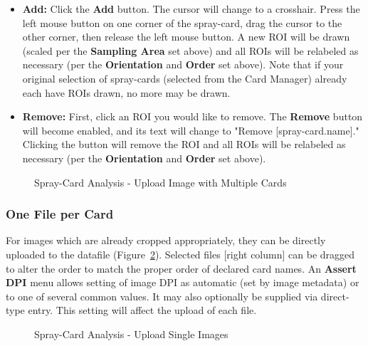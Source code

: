 \documentclass[10pt,letterpaper,titlepage]{article}
\begin{document}
    \begin{itemize} 
        \item \textbf{Add:} Click the \textbf{Add} button. The cursor will change to a crosshair. Press the left mouse button on one corner of the spray-card, drag the cursor to the other corner, then release the left mouse button. A new ROI will be drawn (scaled per the \textbf{Sampling Area} set above) and all ROIs will be relabeled as necessary (per the \textbf{Orientation} and \textbf{Order} set above). Note that if your original selection of spray-cards (selected from the Card Manager) already each have ROIs drawn, no more may be drawn.
        \item \textbf{Remove:} First, click an ROI you would like to remove. The \textbf{Remove} button will become enabled, and its text will change to "Remove [spray-card.name]." Clicking the button will remove the ROI and all ROIs will be relabeled as necessary (per the \textbf{Orientation} and \textbf{Order} set above).
    \end{itemize}
    \begin{figure}[hb]
        \centering
        \caption{Spray-Card Analysis - Upload Image with Multiple Cards}
        \label{fig:card_upload_multiple}
    \end{figure}
    \FloatBarrier

    \subsubsection{One File per Card}
    For images which are already cropped appropriately, they can be directly uploaded to the datafile (Figure~\ref{fig:card_upload_singles}). Selected files [right column] can be dragged to alter the order to match the proper order of declared card names. An \textbf{Assert DPI} menu allows setting of image DPI as automatic (set by image metadata) or to one of several common values. It may also optionally be supplied via direct-type entry. This setting will affect the upload of each file.
    \begin{figure}[hb]
        \centering
        \caption{Spray-Card Analysis - Upload Single Images}
        \label{fig:card_upload_singles}
    \end{figure}
    \FloatBarrier
\end{document}
